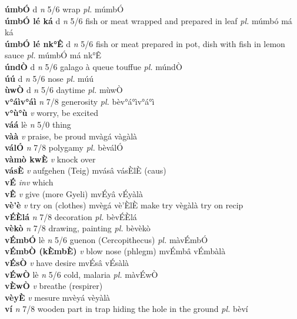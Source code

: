\documentclass{article}
\newlength\cus
\begin{document}
{\bf úmbÓ} d {\it n} 5/6 wrap {\it pl.} múmbÓ         \\ 
{\bf úmbÓ lé ká} d {\it n} 5/6 fish or meat wrapped and prepared in leaf {\it pl.} múmbó má ká         \\ 
{\bf úmbÓ lé nk°Ê} d {\it n} 5/6  fish or meat prepared in pot, dish with fish in lemon sauce {\it pl.} múmbÓ má nk°Ê         \\ 
{\bf úndÒ} d {\it n} 5/6 galago à queue touffue {\it pl.} múndÒ         \\ 
{\bf úú} d {\it n} 5/6 nose {\it pl.} múú         \\ 
{\bf ùwÒ} d {\it n} 5/6 daytime {\it pl.} mùwÒ         \\ 
{\bf v°áìv°áì}  {\it n} 7/8 generosity {\it pl.} bèv°á°ìv°á°ì         \\ 
{\bf v°ù°ù}  {\it v} worry, be excited         \\ 
{\bf váá} lè {\it n} 5/0 thing         \\ 
{\bf vàà}  {\it v} praise, be proud   mvàgá   vàgàlà   \\ 
{\bf válÓ}  {\it n} 7/8 polygamy {\it pl.} bèválÓ         \\ 
{\bf vàmò kwÈ}  {\it v} knock over         \\ 
{\bf vásÈ}  {\it v} aufgehen (Teig)   mvásâ vásÈlÈ (caus)     \\ 
{\bf vÉ}  {\it inv} which         \\ 
{\bf vÊ}  {\it v} give (more Gyeli)   mvÉyâ   vÉyàlà   \\ 
{\bf vè'è}  {\it v} try on (clothes)   mvègá vè'ÈlÈ make try  vègàlà try on recip   \\ 
{\bf vÉÈlá}  {\it n} 7/8 decoration {\it pl.} bèvÉÈlá         \\ 
{\bf vèkò}  {\it n} 7/8 drawing, painting {\it pl.} bèvèkò         \\ 
{\bf vÉmbÓ} lè {\it n} 5/6 guenon (Cercopithecus) {\it pl.} màvÉmbÓ         \\ 
{\bf vÉmbÒ (kÈmbÈ)}  {\it v} blow nose (phlegm)   mvÉmbâ   vÉmbàlà   \\ 
{\bf vÉsÒ}  {\it v} have desire   mvÉsâ   vÉsàlà   \\ 
{\bf vÉwÒ} lè {\it n} 5/6 cold, malaria {\it pl.} màvÉwÒ         \\ 
{\bf vÈwÒ}  {\it v} breathe (respirer)         \\ 
{\bf vèyÈ}  {\it v} mesure   mvèyá   vèyàlà   \\ 
{\bf ví}  {\it n} 7/8 wooden part in trap hiding the hole in the ground {\it pl.} bèví         \\ 
\end{document}
